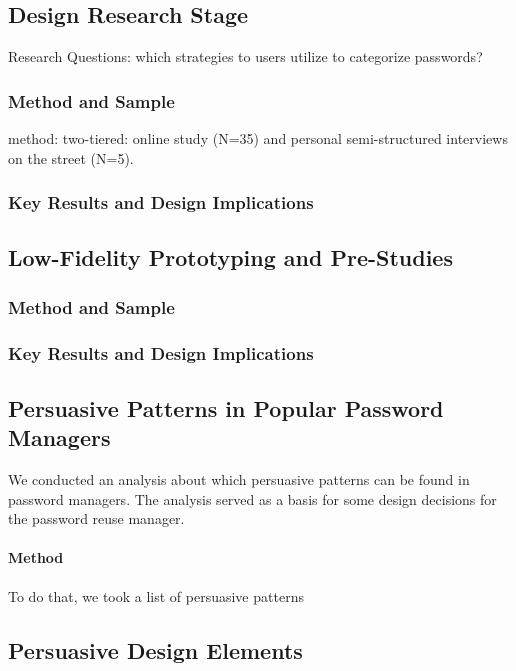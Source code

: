 \subsection{Design Research Stage}
Research Questions: which strategies to users utilize to categorize passwords?

\subsubsection{Method and Sample}
method: two-tiered: online study (N=35) and personal semi-structured interviews on the street (N=5). 

\subsubsection{Key Results and Design Implications}

\subsection{Low-Fidelity Prototyping and Pre-Studies}

\subsubsection{Method and Sample}

\subsubsection{Key Results and Design Implications}


\subsection{Persuasive Patterns in Popular Password Managers}
We conducted an analysis about which persuasive patterns can be found in password managers. The analysis served as a basis for some design decisions for the password reuse manager. 

\paragraph{Method}
To do that, we took a list of persuasive patterns 

\subsection{Persuasive Design Elements}

